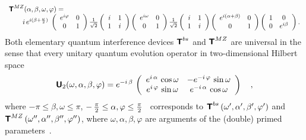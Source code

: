 \documentclass[prl,amsfonts,amsmath,showpacs,showkeys,preprint]{revtex4}
\begin{document}
\begin{equation}
\begin{array}{l}
{\textsf{\textbf{T}}}^{MZ} (\alpha ,\beta ,\omega ,\varphi )=  \\
\qquad
i \, e^{i(\beta +{\omega \over 2})}\;
\left(
\begin{array}{cc}
e^{i\varphi }& 0\\
0& 1
 \end{array}
\right)
{1\over \sqrt{2}}\left(
\begin{array}{cc}
i& 1\\
1& i
 \end{array}
\right)
\left(
\begin{array}{cc}
e^{i\omega}& 0\\
0&1
 \end{array}
\right)
{1\over \sqrt{2}}\left(
\begin{array}{cc}
i& 1\\
1& i
 \end{array}
\right)
\left(
\begin{array}{cc}
e^{i(\alpha+\beta )}& 0\\
0&1
 \end{array}
\right)
\left(
\begin{array}{cc}
1& 0\\
0& e^{i\beta}
 \end{array}
\right)
 .
 \end{array}
\label{e:quid2mm}
\end{equation}
Both elementary quantum interference devices
${\textsf{\textbf{T}}}^{bs}$
and
${\textsf{\textbf{T}}}^{MZ}$
are  universal in the
sense that
 every unitary quantum
evolution operator in two-dimensional Hilbert space
\begin{equation}
\textsf{\textbf{U}}_2(\omega ,\alpha ,\beta ,\varphi )=e^{-i\,\beta}\,
\left(
\begin{array}{cc}
{e^{i\,\alpha }}\,\cos \omega
&
{-e^{-i\,\varphi }}\,\sin \omega
\\
{e^{i\,\varphi }}\,\sin \omega
&
{e^{-i\,\alpha }}\,\cos \omega
 \end{array}
\right)
 \quad ,
\label{e:quid3}
\end{equation}
where $-\pi \le \beta ,\omega \le \pi$,
$-\, {\pi \over 2} \le  \alpha ,\varphi \le {\pi \over 2}$~\cite{murnaghan}
corresponds to
${\textsf{\textbf{T}}}^{bs}
\left(\omega' ,
\alpha',
\beta' ,
\varphi'
\right)$
and
${\textsf{\textbf{T}}}^{MZ}
\left(\omega'' ,
\alpha'' ,
\beta'' ,
\varphi''
\right)$, where $\omega ,\alpha ,\beta ,\varphi $ are arguments of the (double) primed parameters~\cite{svozil-2004-analog}.
\end{document}
